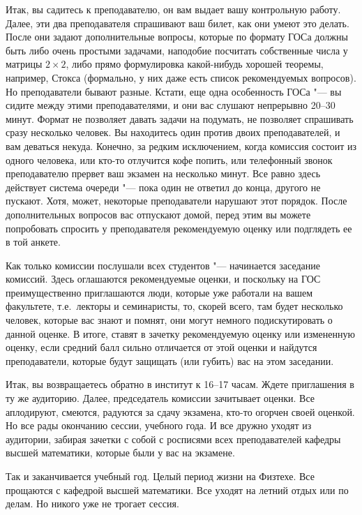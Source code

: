 Итак, вы садитесь к преподавателю, он вам выдает вашу контрольную работу. Далее, эти два преподавателя спрашивают ваш билет, как они умеют это делать. После они задают дополнительные вопросы, которые по формату ГОСа должны быть либо очень простыми задачами, наподобие посчитать собственные числа у матрицы $2\times 2$, либо прямо формулировка какой-нибудь хорошей теоремы, например, Стокса (формально, у них даже есть список рекомендуемых вопросов). Но преподаватели бывают разные. Кстати, еще одна особенность ГОСа "--- вы сидите между этими преподавателями, и они вас слушают непрерывно 20--30 минут. Формат не позволяет давать задачи на подумать, не позволяет спрашивать сразу несколько человек. Вы находитесь один против двоих преподавателей, и вам деваться некуда. Конечно, за редким исключением, когда комиссия состоит из одного человека, или кто-то отлучится кофе попить, или телефонный звонок преподавателю прервет ваш экзамен на несколько минут. Все равно здесь действует система очереди "--- пока один не ответил до конца, другого не пускают. Хотя, может, некоторые преподаватели нарушают этот порядок. После дополнительных вопросов вас отпускают домой, перед этим вы можете попробовать спросить у преподавателя рекомендуемую оценку или подглядеть ее в той анкете.

Как только комиссии послушали всех студентов "--- начинается заседание комиссий. Здесь оглашаются рекомендуемые оценки, и поскольку на ГОС преимущественно приглашаются люди, которые уже работали на вашем факультете, т.е.~лекторы и семинаристы, то, скорей всего, там будет несколько человек, которые вас знают и помнят, они могут немного подискутировать о данной оценке. В итоге, ставят в зачетку рекомендуемую оценку или измененную оценку, если средний балл сильно отличается от этой оценки и найдутся преподаватели, которые будут защищать (или губить) вас на этом заседании.

Итак, вы возвращаетесь обратно в институт к 16--17 часам. Ждете приглашения в ту же аудиторию. Далее, председатель комиссии зачитывает оценки. Все аплодируют, смеются, радуются за сдачу экзамена, кто-то огорчен своей оценкой. Но все рады окончанию сессии, учебного года. И все дружно уходят из аудитории, забирая зачетки с собой с росписями всех преподавателей кафедры высшей математики, которые были у вас на экзамене.

Так и заканчивается учебный год. Целый период жизни на Физтехе. Все прощаются с кафедрой высшей математики. Все уходят на летний отдых или по делам. Но никого уже не трогает сессия.

